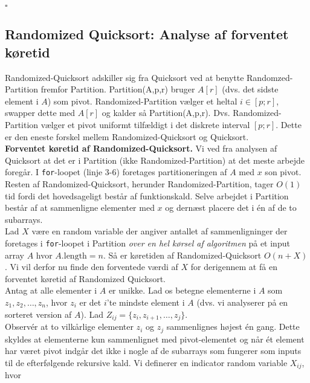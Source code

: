 \documentclass[12pt]{article}
\begin{document}
\begin{flushright}
    $\square$
\end{flushright}

\subsection*{Randomized Quicksort: Analyse af forventet køretid}

Randomized-Quicksort adskiller sig fra Quicksort ved at benytte Randomzed-Partition fremfor Partition. Partition(A,p,r) bruger $A[r]$ (dvs. det sidste element i $A$) som pivot. Randomized-Partition vælger et heltal $i \in [p;r]$, swapper dette med $A[r]$ og kalder så Partition(A,p,r). Dvs. Randomized-Partition vælger et pivot uniformt tilfældigt i det diskrete interval $[p;r]$. Dette er den eneste forskel mellem Randomized-Quicksort og Quicksort. \\

\textbf{Forventet køretid af Randomized-Quicksort.} Vi ved fra analysen af Quicksort at det er i Partition (ikke Randomized-Partition) at det meste arbejde foregår. I \texttt{for}-loopet (linje 3-6) foretages partitioneringen af $A$ med $x$ son pivot. Resten af Randomized-Quicksort, herunder Randomized-Partition, tager $O(1)$ tid fordi det hovedsageligt består af funktionskald. Selve arbejdet i Partition består af at sammenligne elementer med $x$ og dernæst placere det i én af de to subarrays. \\

Lad $X$ være en random variable der angiver antallet af sammenligninger der foretages i \texttt{for}-loopet i Partition \textit{over en hel kørsel af algoritmen} på et input array $A$ hvor $A.\text{length}=n$. Så er køretiden af Randomized-Quicksort $O(n+X)$. Vi vil derfor nu finde den forventede værdi af $X$ for derigennem at få en forventet køretid af Randomized Quicksort. \\

Antag at alle elementer i $A$ er unikke. Lad os betegne elementerne i $A$ som $z_1, z_2, \ldots, z_n$, hvor $z_i$ er det $i$'te mindste element i $A$ (dvs. vi analyserer på en sorteret version af $A$). Lad $Z_{ij}=\{z_i, z_{i+1},\ldots, z_j\}$. \\

Observér at to vilkårlige elementer $z_i$ og $z_j$ sammenlignes højest én gang. Dette skyldes at elementerne kun sammenlignet med pivot-elementet og når ét element har været pivot indgår det ikke i nogle af de subarrays som fungerer som inputs til de efterfølgende rekursive kald. Vi definerer en indicator random variable $X_{ij}$, hvor
\end{document}
